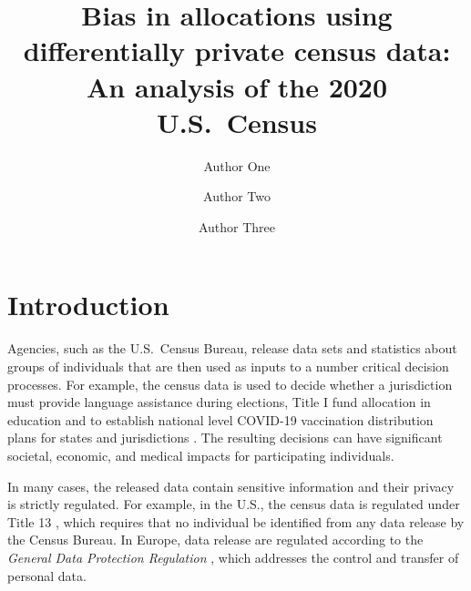 \documentclass[9pt,twocolumn,twoside,lineno]{pnas-new}
\title{Bias in allocations using differentially private census data: An analysis of the 2020 U.S.~Census}
\author[a,c,1]{Author One}
\author[b,1,2]{Author Two}
\author[a]{Author Three}
\affil[a]{Affiliation One}
\affil[b]{Affiliation Two}
\affil[c]{Affiliation Three}
\begin{document}
\maketitle
\thispagestyle{firststyle}




\section*{Introduction}

Agencies, such as the U.S.~Census Bureau, release data sets and
statistics about groups of individuals that are then used as inputs to
a number critical decision processes.  For example, the census data is
used to decide whether a jurisdiction must provide language assistance
during elections, Title I fund allocation in education \cite{pujol:20}
and to establish national level COVID-19 vaccination distribution plans 
for states and jurisdictions \cite{covid}.
The resulting decisions can have significant societal, economic, and medical 
impacts for participating individuals. 

In many cases, the released data
contain sensitive information and their privacy is strictly regulated.
For example, in the U.S., the census data is regulated under Title 13
\cite{title13}, which requires that no individual be identified from
any data release by the Census Bureau. In Europe, data release are
regulated according to the \emph{General Data Protection Regulation}
\cite{GDPR}, which addresses the control and transfer of personal data.
\end{document}
